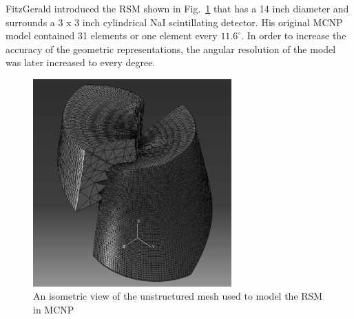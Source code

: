 \documentclass[3p,times]{elsarticle}
\begin{document}
FitzGerald\cite{FitzGerald2015} introduced the RSM shown in Fig.~\ref{fig:RSM} that has a 14 inch diameter and surrounds a 3 x 3 inch cylindrical NaI scintillating detector.  His original MCNP model contained 31 elements or one element every $11.6^\circ$.  In order to increase the accuracy of the geometric representations,  the angular resolution of the model was later increased to every degree.  

\begin{figure}[ht!]
\includegraphics[width={3.0in}]{../figs/P2AtIso.pdf}
\centering
\caption{An isometric view of the unstructured mesh used to model the RSM in MCNP}
\label{fig:RSM}
\end{figure}
\end{document}
